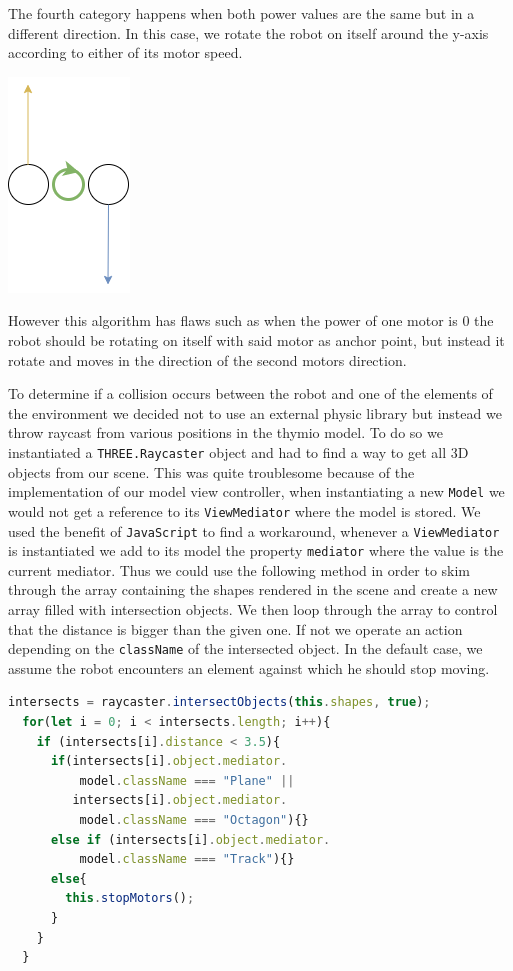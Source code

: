 \documentclass{scrbook}
\begin{document}
The fourth category happens when both power values are the same but in a different direction. In this case, we rotate the robot on itself around the y-axis according to either of its motor speed.
\begin{center}
  \includegraphics[scale=1]{./move_spdd}
\end{center}

However this algorithm has flaws such as when the power of one motor is 0 the robot should be rotating on itself with said motor as anchor point, but instead it rotate and moves in the direction of the second motors direction.

To determine if a collision occurs between the robot and one of the elements of the environment we decided not to use an external physic library but instead we throw raycast from various positions in the thymio model. To do so we instantiated a \texttt{THREE.Raycaster} 
object and had to find a way to get all 3D objects from our scene. This was quite troublesome because of the implementation of our model view controller, when instantiating a new \texttt{Model} we would not get a reference to its \texttt{ViewMediator} where the model is stored. 
We used the benefit of \texttt{JavaScript} to find a workaround, whenever a \texttt{ViewMediator} is instantiated we add to its model the property \texttt{mediator} where the value is the current mediator. Thus we could use the following method in order to skim through the array containing the shapes rendered in the scene and create a new array filled with intersection objects. We then loop through the array to control that the distance is bigger than the given one. If not we operate an action depending on the \texttt{className} of the intersected object. 
In the default case, we assume the robot encounters an element against which he should stop moving.
\begin{lstlisting}[language=JavaScript, basicstyle=\ttfamily\small]
  intersects = raycaster.intersectObjects(this.shapes, true);
  for(let i = 0; i < intersects.length; i++){
    if (intersects[i].distance < 3.5){
      if(intersects[i].object.mediator.
          model.className === "Plane" ||
         intersects[i].object.mediator.
          model.className === "Octagon"){}
      else if (intersects[i].object.mediator.
          model.className === "Track"){}
      else{
        this.stopMotors();
      }
    }
  }
\end{lstlisting} 
\end{document}

